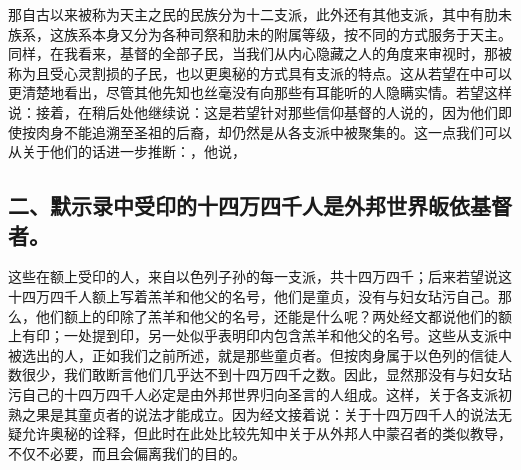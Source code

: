 那自古以来被称为天主之民的民族分为十二支派，此外还有其他支派，其中有肋未族系，这族系本身又分为各种司祭和肋未的附属等级，按不同的方式服务于天主。同样，在我看来，基督的全部子民，当我们从内心隐藏之人的角度来审视时，那被称为且受心灵割损的子民，也以更奥秘的方式具有支派的特点。这从若望在中可以更清楚地看出，尽管其他先知也丝毫没有向那些有耳能听的人隐瞒实情。\newline{}若望这样说：\newline{}接着，在稍后处他继续说：\newline{}这是若望针对那些信仰基督的人说的，因为他们即使按肉身不能追溯至圣祖的后裔，却仍然是从各支派中被聚集的。这一点我们可以从关于他们的话进一步推断：，他说，\par


\subsection{二、默示录中受印的十四万四千人是外邦世界皈依基督者。}

这些在额上受印的人，来自以色列子孙的每一支派，共十四万四千；后来若望说这十四万四千人额上写着羔羊和他父的名号，他们是童贞，没有与妇女玷污自己。那么，他们额上的印除了羔羊和他父的名号，还能是什么呢？两处经文都说他们的额上有印；一处提到印，另一处似乎表明印内包含羔羊和他父的名号。这些从支派中被选出的人，正如我们之前所述，就是那些童贞者。但按肉身属于以色列的信徒人数很少，我们敢断言他们几乎达不到十四万四千之数。因此，显然那没有与妇女玷污自己的十四万四千人必定是由外邦世界归向圣言的人组成。这样，关于各支派初熟之果是其童贞者的说法才能成立。因为经文接着说：关于十四万四千人的说法无疑允许奥秘的诠释，但此时在此处比较先知中关于从外邦人中蒙召者的类似教导，不仅不必要，而且会偏离我们的目的。\par

